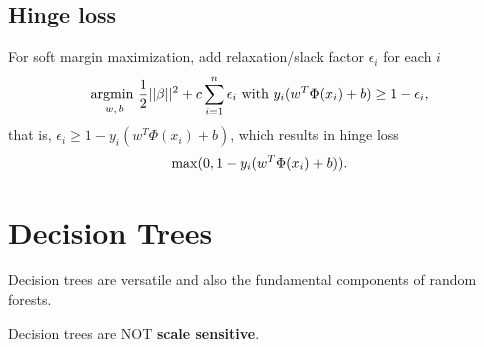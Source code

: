 \documentclass[12pt,oneside,a4paper]{article}
\numberwithin{equation}{section}
\newcommand{\argmin}[1]{\stackunder{\textrm{argmin }}{\scriptsize$#1$}}
\newcommand{\rmmax}[1]{\stackunder{\textrm{max}}{\scriptsize$#1$}}
\begin{document}
\subsection{Hinge loss}
For soft margin maximization, add relaxation/slack factor $\epsilon_i$ for each $i$
\begin{equation}
\argmin{w,b}\frac{1}{2}||\beta||^2 + c \sum_{i=1}^{n}\epsilon_i\textrm{ with } y_i(w^T\Phi(x_i) + b) \ge 1 - \epsilon_i,
\end{equation}
that is, $\epsilon_i \ge 1- y_i(w^T\Phi(x_i) + b) $, which results in hinge loss
\begin{equation}
\rmmax{}(0, 1- y_i(w^T\Phi(x_i) + b)).
\end{equation}

\section{Decision Trees}
Decision trees are versatile and also the fundamental components of random forests. 

Decision trees are NOT \textbf{scale sensitive}.
\end{document}
